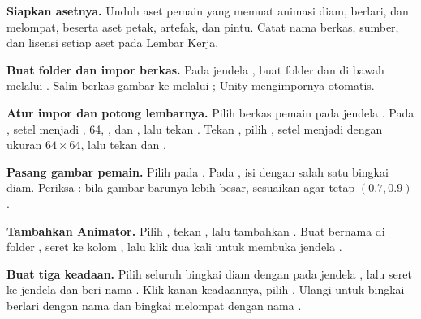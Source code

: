 \begin{langkah}
  \item \textbf{Siapkan asetnya.} Unduh aset pemain yang memuat animasi diam,
        berlari, dan melompat, beserta aset petak, artefak, dan pintu. Catat
        nama berkas, sumber, dan lisensi setiap aset pada Lembar Kerja.

  \item \textbf{Buat folder dan impor berkas.} Pada jendela ,
        buat folder  dan  di bawah
         melalui . Salin berkas gambar ke
         melalui ; Unity mengimpornya
        otomatis.

  \item \textbf{Atur impor dan potong lembarnya.} Pilih berkas pemain pada
        jendela . Pada , setel  menjadi ,  64,
         , dan  ,
        lalu tekan . Tekan , pilih
        , setel  menjadi 
        dengan ukuran $64 \times 64$, lalu tekan  dan
        .

  \item \textbf{Pasang gambar pemain.} Pilih  pada
        . Pada , isi 
        dengan salah satu bingkai diam. Periksa :
        bila gambar barunya lebih besar, sesuaikan  agar tetap
        $(0.7,0.9)$.

  \item \textbf{Tambahkan Animator.} Pilih , tekan
        , lalu tambahkan . Buat
         bernama  di
        folder , seret ke kolom ,
        lalu klik dua kali untuk membuka jendela
        .

  \item \textbf{Buat tiga keadaan.} Pilih seluruh bingkai diam dengan
         pada jendela , lalu seret ke jendela
         dan beri nama . Klik kanan keadaannya,
        pilih . Ulangi untuk bingkai
        berlari dengan nama  dan bingkai melompat dengan nama
        .


\end{langkah}
